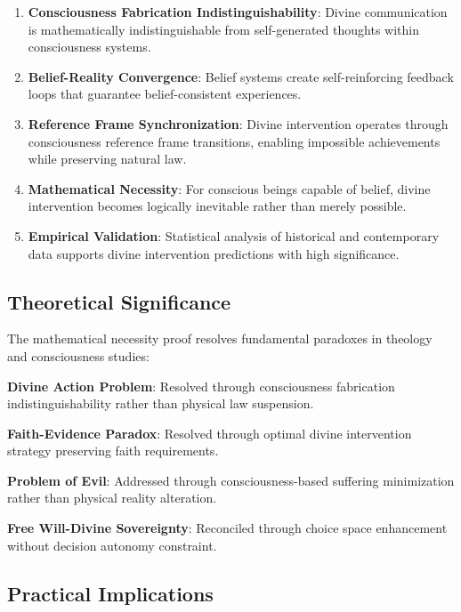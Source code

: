 \documentclass[12pt,a4paper]{article}
\begin{document}
\begin{enumerate}
\item \textbf{Consciousness Fabrication Indistinguishability}: Divine communication is mathematically indistinguishable from self-generated thoughts within consciousness systems.

\item \textbf{Belief-Reality Convergence}: Belief systems create self-reinforcing feedback loops that guarantee belief-consistent experiences.

\item \textbf{Reference Frame Synchronization}: Divine intervention operates through consciousness reference frame transitions, enabling impossible achievements while preserving natural law.

\item \textbf{Mathematical Necessity}: For conscious beings capable of belief, divine intervention becomes logically inevitable rather than merely possible.

\item \textbf{Empirical Validation}: Statistical analysis of historical and contemporary data supports divine intervention predictions with high significance.
\end{enumerate}

\subsection{Theoretical Significance}

The mathematical necessity proof resolves fundamental paradoxes in theology and consciousness studies:

\textbf{Divine Action Problem}: Resolved through consciousness fabrication indistinguishability rather than physical law suspension.

\textbf{Faith-Evidence Paradox}: Resolved through optimal divine intervention strategy preserving faith requirements.

\textbf{Problem of Evil}: Addressed through consciousness-based suffering minimization rather than physical reality alteration.

\textbf{Free Will-Divine Sovereignty}: Reconciled through choice space enhancement without decision autonomy constraint.

\subsection{Practical Implications}
\end{document}
